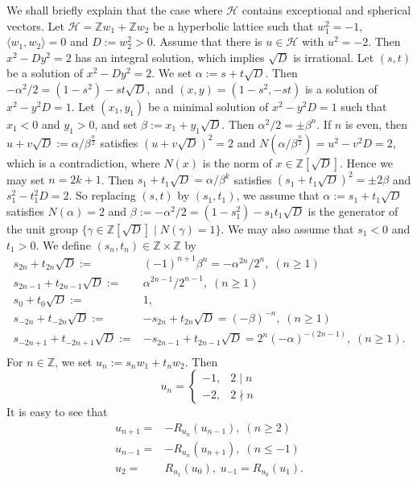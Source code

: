 \documentclass[leqno,11pt]{amsart}
\def\Z{\ensuremath{\mathbb{Z}}}
\theoremstyle{definition}
\def\Z{\ensuremath{\mathbb{Z}}}
\def\HH{\ensuremath{\mathcal H}}
\begin{document}
We shall briefly explain that the case where $\HH$ contains 
exceptional and spherical vectors.
Let $\HH=\Z w_1 +\Z w_2$ be a hyperbolic lattice
such that $w_1^2=-1$, $\langle w_1,w_2 \rangle=0$ and
$D:=w_2^2>0$.
Assume that there is $u \in \HH$ with $u^2=-2$.
Then 
$x^2-D y^2=2$ has an integral solution, which implies
$\sqrt{D}$ is irrational.
Let $(s,t)$ be a solution of $x^2-D y^2=2$.
We set $\alpha:=s+t \sqrt{D}$.
Then $-\alpha^2/2=(1-s^2)-s t \sqrt{D},$
and $(x,y)=(1-s^2,-s t)$ is a solution of
$x^2-y^2D=1$.
Let $(x_1,y_1)$ be a minimal solution of
$x^2-y^2D=1$ such that $x_1<0$ and $y_1>0$, and set
$\beta:=x_1+y_1 \sqrt{D}$.
Then $\alpha^2/2=\pm \beta^n$.
If $n$ is even, then
$u+v\sqrt{D}:=\alpha/\beta^{\frac{n}{2}}$
satisfies $(u+v\sqrt{D})^2=2$ and $N(\alpha/\beta^{\frac{n}{2}})=u^2-v^2 D=2$,
which is a contradiction, where 
$N(x)$ is the norm of $x \in \Z[\sqrt{D}]$.
Hence we may set $n=2k+1$.
Then $s_1+t_1 \sqrt{D}=\alpha/\beta^{k}$
satisfies $(s_1+t_1 \sqrt{D})^2=\pm 2\beta$ and
$s_1^2-t_1^2 D=2$.
So replacing $(s,t)$ by $(s_1,t_1)$,
we assume that $\alpha:=s_1 +t_1 \sqrt{D}$ satisfies
$N(\alpha)=2$ and $\beta:=-\alpha^2/2=(1-s_1^2)-s_1 t_1 \sqrt{D}$
is the generator of the unit group
$\{ \gamma \in \Z[\sqrt{D}] \mid N(\gamma)=1 \}$.
We may also assume that $s_1<0$ and $t_1>0$.
We define $(s_n,t_n) \in \Z \times \Z$ by 
\begin{equation}
\begin{split}
s_{2n}+t_{2n} \sqrt{D}:=& (-1)^{n+1}\beta^n=-\alpha^{2n}/2^n,\; (n \geq 1)\\
s_{2n-1}+t_{2n-1}\sqrt{D}:=& \alpha^{2n-1}/2^{n-1},\; (n \geq 1)\\
s_0+t_0\sqrt{D}:=& 1,\\
s_{-2n}+t_{-2n} \sqrt{D}:=&-s_{2n}+t_{2n}\sqrt{D}=(-\beta)^{-n},\; (n \geq 1)\\
s_{-2n+1}+t_{-2n+1} \sqrt{D}:=& -s_{2n-1}+t_{2n-1}\sqrt{D}
=2^{n} (-\alpha)^{-(2n-1)},\; (n \geq 1).\\
\end{split}
\end{equation}
%
For $n \in \Z$, we set $u_n:=s_n w_1+t_n w_2$.
Then 
$$
u_n=\begin{cases}
-1,& 2 \mid n\\
-2, & 2 \nmid n
\end{cases} 
$$
It is easy to see that
\begin{equation}
\begin{split}
u_{n+1}=& -R_{u_n}(u_{n-1}),\;(n \geq 2)\\
u_{n-1}=& -R_{u_n}(u_{n+1}),\;(n \leq -1)\\
u_2=& R_{u_1}(u_0),\;u_{-1}=R_{u_0}(u_1).
\end{split}
\end{equation}
\end{document}
